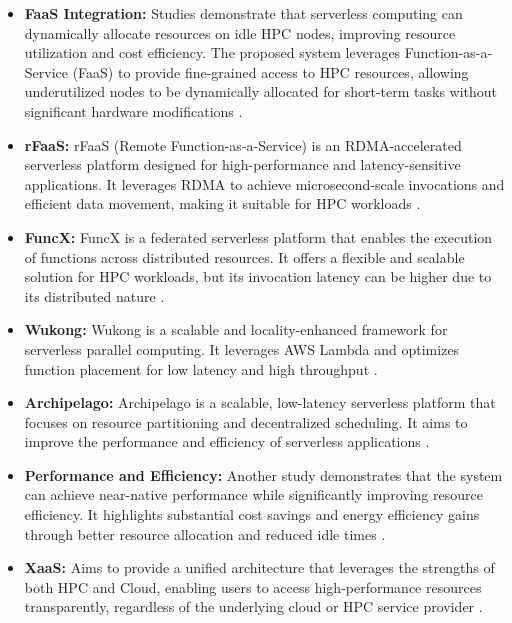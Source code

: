     \begin{itemize}
        \item \textbf{FaaS Integration:} Studies demonstrate that serverless computing can dynamically allocate resources on idle HPC nodes, improving resource utilization and cost efficiency. The proposed system leverages Function-as-a-Service (FaaS) to provide fine-grained access to HPC resources, allowing underutilized nodes to be dynamically allocated for short-term tasks without significant hardware modifications \cite{copik_software_2024}.
        \item \textbf{rFaaS:} rFaaS (Remote Function-as-a-Service) is an RDMA-accelerated serverless platform designed for high-performance and latency-sensitive applications. It leverages RDMA to achieve microsecond-scale invocations and efficient data movement, making it suitable for HPC workloads \cite{copik_rfaas_2023}.
        \item \textbf{FuncX:} FuncX is a federated serverless platform that enables the execution of functions across distributed resources. It offers a flexible and scalable solution for HPC workloads, but its invocation latency can be higher due to its distributed nature \cite{chard_funcx_2020}.
        \item \textbf{Wukong:} Wukong is a scalable and locality-enhanced framework for serverless parallel computing. It leverages AWS Lambda and optimizes function placement for low latency and high throughput \cite{carver2020wukong}.
        \item \textbf{Archipelago:} Archipelago is a scalable, low-latency serverless platform that focuses on resource partitioning and decentralized scheduling. It aims to improve the performance and efficiency of serverless applications \cite{singhvi_archipelago_2019}.
        \item \textbf{Performance and Efficiency:}  Another study demonstrates that the system can achieve near-native performance while significantly improving resource efficiency. It highlights substantial cost savings and energy efficiency gains through better resource allocation and reduced idle times \cite{tavares_leveraging_2021}.
        \item \textbf{XaaS:} Aims to provide a unified architecture that leverages the strengths of both HPC and Cloud, enabling users to access high-performance resources transparently, regardless of the underlying cloud or HPC service provider \cite{XaaS-torsten}.
    \end{itemize}

